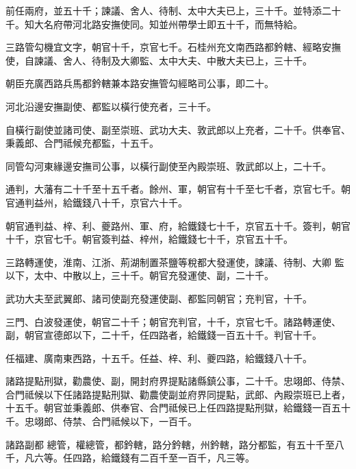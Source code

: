 \begin{pinyinscope}
 前任兩府，並五十千；諫議、舍人、待制、太中大夫已上，三十千。並特添二十千。知大名府帶河北路安撫使同。知並州帶學士即五十千，而無特給。



 三路管勾機宜文字，朝官十千，京官七千。石桂州充文南西路都鈐轄、經略安撫使，自諫議、舍人、待制及大卿監、太中大夫、中散大夫已上，三十千。



 朝臣充廣西路兵馬都鈐轄兼本路安撫管勾經略司公事，即二十。



 河北沿邊安撫副使、都監以橫行使充者，三十千。



 自橫行副使並諸司使、副至崇班、武功大夫、敦武郎以上充者，二十千。供奉官、秉義郎、合門祗候充都監，十五千。



 同管勾河東緣邊安撫司公事，以橫行副使至內殿崇班、敦武郎以上，二十千。



 通判，大藩有二十千至十五千者。餘州、軍，朝官有十千至七千者，京官七千。朝官通判益州，給鐵錢八十千，京官六十千。



 朝官通判益、梓、利、夔路州、軍、府，給鐵錢七十千，京官五十千。簽判，朝官十千，京官七千。朝官簽判益、梓州，給鐵錢七十千，京官五十千。



 三路轉運使，淮南、江浙、荊湖制置茶鹽等稅都大發運使，諫議、待制、大卿
 監以下，太中、中散以上，三十千。朝官充發運使、副，二十千。



 武功大夫至武翼郎、諸司使副充發運使副、都監同朝官；充判官，十千。



 三門、白波發運使，朝官二十千；朝官充判官，十千，京官七千。諸路轉運使、副，朝官宣德郎以下，二十千，任四路者，給鐵錢一百五十千。判官十千。



 任福建、廣南東西路，十五千。任益、梓、利、夔四路，給鐵錢八十千。



 諸路提點刑獄，勸農使、副，開封府界提點諸縣鎮公事，二十千。忠翊郎、侍禁、合門祗候以下任諸路提點刑獄、勸農使副並府界同提點，武郎、內殿崇班已上者，十五千。朝官並秉義郎、供奉官、合門祗候已上任四路提點刑獄，給鐵錢一百五十千。忠翊郎、侍禁、合門祗候以下，一百千。



 諸路副都
 總管，權總管，都鈐轄，路分鈐轄，州鈐轄，路分都監，有五十千至八千，凡六等。任四路，給鐵錢有二百千至一百千，凡三等。




\end{pinyinscope}
